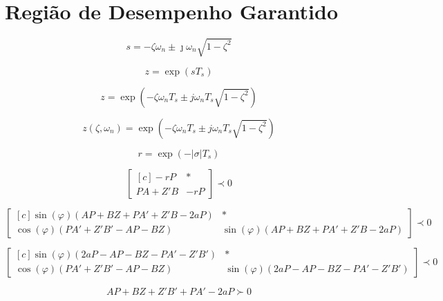 \chapter{Região de Desempenho Garantido}

\begin{equation}
  s = -\zeta\omega_n \pm \jmath\omega_n \sqrt {1-\zeta^2} \label{eq:PontoPlanoS}
\end{equation}

\begin{equation}
  z = \exp(sT_s)\label{eq:TransformacaoSZ}
\end{equation}

\begin{equation}
  z = \exp{\left(-\zeta\omega_nT_s \pm j\omega_nT_s\sqrt{1-\zeta^2}\right)}\label{eq:PontoPlanoZ}
\end{equation}

\begin{equation}
  z(\zeta,\omega_n) = \exp{\left(-\zeta\omega_nT_s \pm j\omega_nT_s\sqrt{1-\zeta^2}\right)}\label{eq:FuncaoPontoZ}
\end{equation}

\begin{equation}
  r = \exp{\left(-|\sigma|T_s\right)}\label{eq:RaioEstabilidadeRelativa}
\end{equation}

\begin{equation}
  \begin{bmatrix*}[c]
    -rP       & * \\
    PA + Z'B  & -rP
  \end{bmatrix*}
  \prec 0\label{eq:LMIEstabilidadeRelativa}
\end{equation}

\begin{equation}
  \begin{bmatrix*}[c]
    \sin{(\varphi)(AP + BZ + PA' + Z'B -2aP)} & * \\
    \cos{(\varphi)(PA' + Z'B'- AP - BZ)}      &  \sin{(\varphi)(AP + BZ + PA' + Z'B -2aP)}
  \end{bmatrix*}
  \prec 0\label{eq:LMIESetorConicoEsquerdo}
\end{equation}

\begin{equation}
  \begin{bmatrix*}[c]
    \sin{(\varphi)(2aP - AP - BZ - PA' - Z'B')} & * \\
    \cos{(\varphi)(PA' + Z'B' - AP - BZ)}       & \sin{(\varphi)(2aP - AP - BZ - PA' - Z'B')}
  \end{bmatrix*}
  \prec 0\label{eq:LMIESetorConicoDireito}
\end{equation}

\begin{equation}
  AP + BZ + Z'B' + PA' -2aP\label{eq:LMIRightBounded} \succ 0
\end{equation}

\begin{figure}
  \center
  
\end{figure}

\begin{figure}
  \center
  
\end{figure}